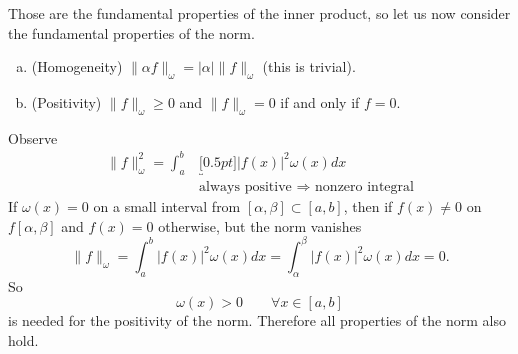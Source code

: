 Those are the fundamental properties of the inner product,
so let us now consider the fundamental properties of the norm.

\begin{enumerate}[(a)]
\item{(Homogeneity)} $\|\alpha f\|_{\omega} =
  |\alpha|\|f\|_{\omega}$ (this is trivial).
\item{(Positivity)} $\|f\|_{\omega}\geq 0$ and
  $\|f\|_{\omega}=0$ if and only if $f=0$.
\end{enumerate}
Observe
\begin{align}
\|f\|^{2}_{\omega} =
\int^{b}_{a}&\underbracket[0.5pt]{|f(x)|^{2}\omega(x)}dx\\
&\text{always positive }\Rightarrow\text{ nonzero integral}\nonumber
\end{align}
If $\omega(x)=0$ on a small interval from
$[\alpha,\beta]\subset[a,b]$, then if $f(x)\neq0$ on
$f[\alpha,\beta]$ and $f(x)=0$ otherwise, but the norm
vanishes
\begin{equation}
\|f\|_{\omega} = \int^{b}_{a}|f(x)|^{2}\omega(x)dx = \int^{\beta}_{\alpha}|f(x)|^{2}\omega(x)dx=0.
\end{equation}
So
\begin{equation}
\omega(x)>0\qquad\forall x\in[a,b]
\end{equation}
is needed for the positivity of the norm. Therefore all
properties of the norm also hold. 

